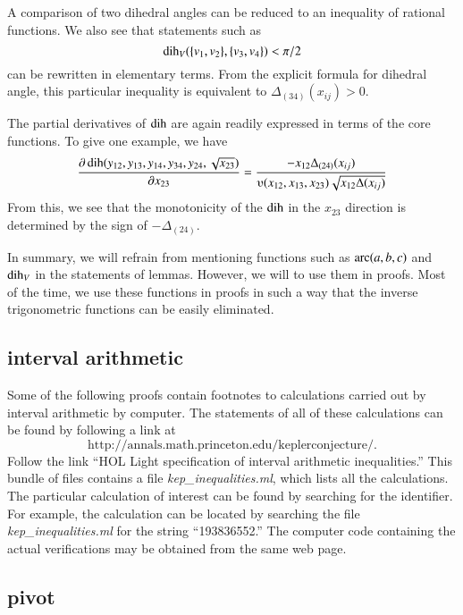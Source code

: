 A comparison of two dihedral angles can be reduced to an inequality
of rational functions. We also see that statements such as
  $$
  \operatorname{dih}_V(\{v_1,v_2\},\{v_3,v_4\}) < \pi/2
  $$
can be rewritten in elementary terms.  From the explicit formula
for dihedral angle, this particular inequality
is equivalent to $\Delta_{(34)}(x_{ij}) > 0$.

The partial derivatives of $\operatorname{dih}$ are again readily expressed in
terms of the core functions.
To give one example, we have
  $$
  \frac{\partial\dih(y_{12},y_{13},y_{14},y_{34},y_{24},\sqrt{x_{23}})}
  {\partial x_{23}} = 
  \frac{ -x_{12} \Delta_{(24)}(x_{ij})} {\ups(x_{12},x_{13},x_{23})
   \sqrt{x_{12}\Delta(x_{ij})}}
  $$
From this, we see that the monotonicity of the $\operatorname{dih}$
in the $x_{23}$ direction is determined by the sign of
$-\Delta_{(24)}$.




In summary, we will refrain from mentioning functions such as
$\operatorname{arc}(a,b,c)$ and $\operatorname{dih}_V$ in the statements of lemmas.  However,
we will to use them in proofs.  Most of the time, we use
these functions in proofs in such a way that the inverse
trigonometric functions
can be easily eliminated.

\newpage

\subsection{interval arithmetic}

Some of the following proofs contain footnotes to calculations
carried out by interval arithmetic by computer.  The statements
of all of these calculations can be found by following a link at
  $$\text{http://annals.math.princeton.edu/keplerconjecture/.}$$  
Follow the
link ``HOL Light specification of interval arithmetic inequalities.''
This bundle of files contains a file {\it kep\_inequalities.ml}, which
lists all the calculations.  The particular calculation of interest
can be found by searching for the identifier.  For example, the
calculation  can be located by searching the file
{\it kep\_inequalities.ml} for the string ``193836552.''
The computer code containing the actual
verifications may be obtained from the same web page.

\newpage

\subsection{pivot}

